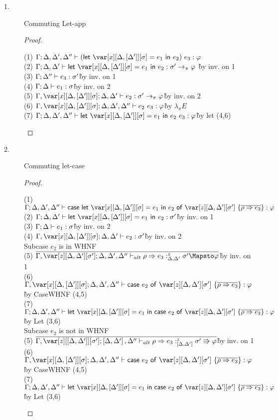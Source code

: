 \begin{description}
\item[1.] Commuting Let-app
\begin{proof}~
\begin{tabbing}
    (1) $\G; \D, \D', \D'' \vdash (\llet{\xD = e_1}{e_2})~e_3 : \vp$\\
    (2) $\G; \D, \D' \vdash \llet{\xD = e_1}{e_2} : \s' \to_\pi \vp$ \`by inv. on 1\\
    (3) $\Gamma; \Delta'' \vdash e_3 : \sigma'$\`by inv. on 1\\
    (4) $\Gamma; \Delta \vdash e_1 : \sigma$\`by inv. on 2\\
    (5) $\G, \xD; \D, \D' \vdash e_2 : \s' \to_\pi \vp$\`by inv. on 2\\
    (6) $\G, \xD; \D, \D', \D'' \vdash e_2~e_3 : \vp$\` by $\lambda_\pi E$\\
    (7) $\G; \D, \D', \D'' \vdash \llet{\xD = e_1}{e_2~e_3} : \vp$\`by let (4,6)\\
\end{tabbing}
\end{proof}

\item[2.] Commuting let-case
\begin{proof}~
\begin{tabbing}
    (1) $\G; \D, \D', \D'' \vdash \ccase{\llet{\xD = e_1}{e_2}}{\z[\D,\D'][\s']~\{\ov{\rho \Rightarrow e_3}\}} : \vp$\\
    (2) $\G; \D, \D' \vdash \llet{\xD = e_1}{e_2} : \s'$\`by inv. on 1\\
    (3) $\Gamma; \Delta \vdash e_1 : \sigma$\`by inv. on 2\\
    (4) $\G, \xD;\D,\D' \vdash e_2 : \s'$\`by inv. on 2\\
    Subcase $e_2$ is in WHNF\\
    (5) $\ov{\G,\z[\D,\D'][\s']; \D, \D', \D'' \vdash_{alt} \rho \Rightarrow e_3 :^z_{\D,\D'} \s' \Mapsto \vp}$\`by inv. on 1\\
    (6) $\G, \xD; \D, \D', \D'' \vdash \ccase{e_2}{\z[\D,\D'][\s']~\{\ov{\rho \Rightarrow e_3}\}} : \vp$\`by CaseWHNF (4,5)\\
    (7) $\G; \D, \D', \D'' \vdash \llet{\xD = e_1}{\ccase{e_2}{\z[\D,\D'][\s']~\{\ov{\rho \Rightarrow e_3}\}}} : \vp$\`by Let (3,6)\\
    Subcase $e_2$ is not in WHNF\\
    (5) $\ov{\G,\z[\irr{\D,\D'}][\s']; \irr{\D, \D'}, \D'' \vdash_{alt} \rho \Rightarrow e_3 :^z_{\irr{\D,\D'}} \s' \Rrightarrow \vp}$\`by inv. on 1\\
    (6) $\G, \xD; \D, \D', \D'' \vdash \ccase{e_2}{\z[\D,\D'][\s']~\{\ov{\rho \Rightarrow e_3}\}} : \vp$\`by CaseWHNF (4,5)\\
    (7) $\G; \D, \D', \D'' \vdash \llet{\xD = e_1}{\ccase{e_2}{\z[\D,\D'][\s']~\{\ov{\rho \Rightarrow e_3}\}}} : \vp$\`by Let (3,6)\\
\end{tabbing}
\end{proof}


\end{description}
